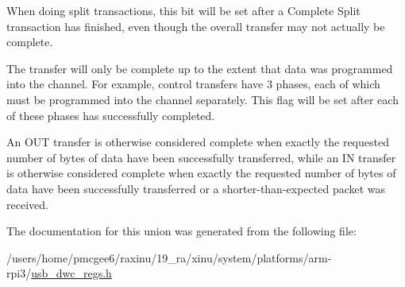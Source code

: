 \begin{DoxyItemize}
\item When doing split transactions, this bit will be set after a Complete Split transaction has finished, even though the overall transfer may not actually be complete.
\item The transfer will only be complete up to the extent that data was programmed into the channel. For example, control transfers have 3 phases, each of which must be programmed into the channel separately. This flag will be set after each of these phases has successfully completed.
\item An O\-U\-T transfer is otherwise considered complete when exactly the requested number of bytes of data have been successfully transferred, while an I\-N transfer is otherwise considered complete when exactly the requested number of bytes of data have been successfully transferred or a shorter-\/than-\/expected packet was received. 
\end{DoxyItemize}

The documentation for this union was generated from the following file\-:\begin{DoxyCompactItemize}
\item 
/users/home/pmcgee6/raxinu/19\-\_\-ra/xinu/system/platforms/arm-\/rpi3/\hyperlink{usb__dwc__regs_8h}{usb\-\_\-dwc\-\_\-regs.\-h}\end{DoxyCompactItemize}
